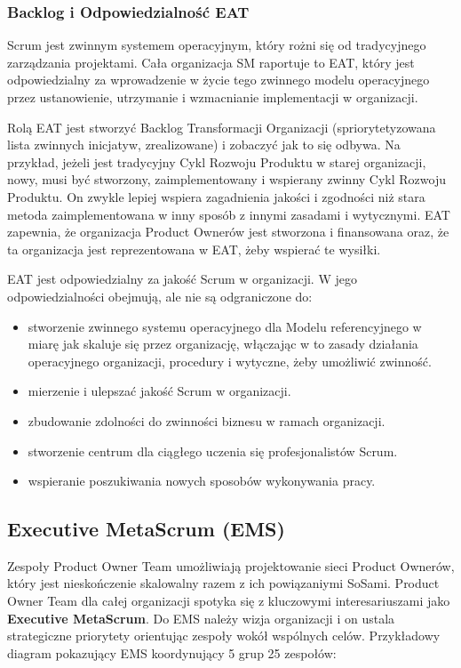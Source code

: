 \documentclass[12pt,a4paper,parskip=full]{scrartcl}
\begin{document}
\subsubsection{Backlog i Odpowiedzialność EAT}

Scrum jest zwinnym systemem operacyjnym, który rożni się od tradycyjnego zarządzania projektami. Cała organizacja SM raportuje to EAT, który jest odpowiedzialny za wprowadzenie w życie tego zwinnego modelu operacyjnego przez ustanowienie, utrzymanie i wzmacnianie implementacji w organizacji.

Rolą EAT jest stworzyć Backlog Transformacji Organizacji (spriorytetyzowana lista zwinnych inicjatyw, zrealizowane) i zobaczyć jak to się odbywa. Na przykład, jeżeli jest tradycyjny Cykl Rozwoju Produktu w starej organizacji, nowy, musi być stworzony, zaimplementowany i wspierany zwinny Cykl Rozwoju Produktu. On zwykle lepiej wspiera zagadnienia jakości i zgodności niż stara metoda zaimplementowana w inny sposób z innymi zasadami i wytycznymi. EAT zapewnia, że organizacja Product Ownerów jest stworzona i finansowana oraz, że ta organizacja jest reprezentowana w EAT, żeby wspierać te wysiłki.

EAT jest odpowiedzialny za jakość Scrum w organizacji. W jego odpowiedzialności obejmują, ale nie są odgraniczone do:

\begin{itemize}
	\item stworzenie zwinnego systemu operacyjnego dla Modelu referencyjnego w miarę jak skaluje się przez organizację, włączając w to zasady działania operacyjnego organizacji, procedury i wytyczne, żeby umożliwić zwinność.
	\item mierzenie i ulepszać jakość Scrum w organizacji.
	\item zbudowanie zdolności do zwinności biznesu w ramach organizacji.
	\item stworzenie centrum dla ciągłego uczenia się profesjonalistów Scrum.
	\item wspieranie poszukiwania nowych sposobów wykonywania pracy.
\end{itemize}

\subsection{Executive MetaScrum (EMS)}

Zespoły Product Owner Team umożliwiają projektowanie sieci Product Ownerów, który jest nieskończenie skalowalny razem z ich powiązaniymi SoSami. Product Owner Team dla całej organizacji spotyka się z kluczowymi interesariuszami jako \textbf{Executive MetaScrum}. Do EMS należy wizja organizacji i on ustala strategiczne priorytety orientując zespoły wokół wspólnych celów.
Przykładowy diagram pokazujący EMS koordynujący 5 grup 25 zespołów:
\end{document}
